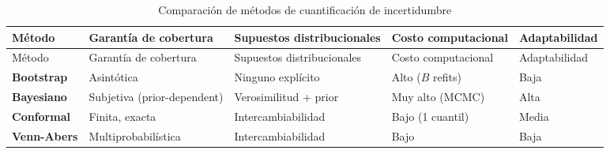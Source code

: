 \documentclass[
  spanish,
  11pt,
  letterpaper,
]{scrbook}
\theoremstyle{plain}
\theoremstyle{remark}
\begin{document}
\begin{longtable}[]{@{}
  >{\raggedright\arraybackslash}p{}
  >{\centering\arraybackslash}p{}
  >{\centering\arraybackslash}p{}
  >{\centering\arraybackslash}p{}
  >{\centering\arraybackslash}p{}@{}}
\caption{Comparación de métodos de cuantificación de
incertidumbre}\label{tbl-uq-comparison}\tabularnewline
\toprule\noalign{}
\begin{minipage}[b]{\linewidth}\raggedright
Método
\end{minipage} & \begin{minipage}[b]{\linewidth}\centering
Garantía de cobertura
\end{minipage} & \begin{minipage}[b]{\linewidth}\centering
Supuestos distribucionales
\end{minipage} & \begin{minipage}[b]{\linewidth}\centering
Costo computacional
\end{minipage} & \begin{minipage}[b]{\linewidth}\centering
Adaptabilidad
\end{minipage} \\
\midrule\noalign{}
\endfirsthead
\toprule\noalign{}
\begin{minipage}[b]{\linewidth}\raggedright
Método
\end{minipage} & \begin{minipage}[b]{\linewidth}\centering
Garantía de cobertura
\end{minipage} & \begin{minipage}[b]{\linewidth}\centering
Supuestos distribucionales
\end{minipage} & \begin{minipage}[b]{\linewidth}\centering
Costo computacional
\end{minipage} & \begin{minipage}[b]{\linewidth}\centering
Adaptabilidad
\end{minipage} \\
\midrule\noalign{}
\endhead
\bottomrule\noalign{}
\endlastfoot
\textbf{Bootstrap} & Asintótica & Ninguno explícito & Alto (\(B\)
refits) & Baja \\
\textbf{Bayesiano} & Subjetiva (prior-dependent) & Verosimilitud + prior
& Muy alto (MCMC) & Alta \\
\textbf{Conformal} & Finita, exacta & Intercambiabilidad & Bajo (1
cuantil) & Media \\
\textbf{Venn-Abers} & Multiprobabilística & Intercambiabilidad & Bajo &
Baja \\
\end{longtable}
\end{document}
